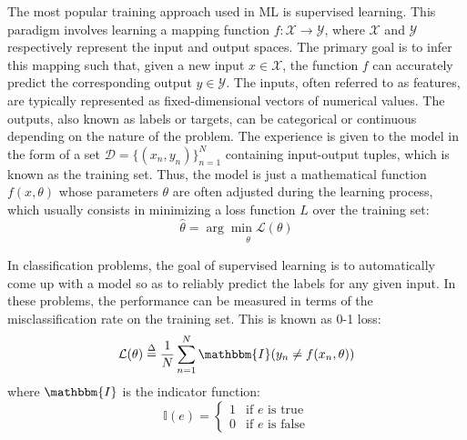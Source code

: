 \documentclass[11pt,english,listoffigures,listoftables]{tfgetsinf}
\begin{document}
The most popular training approach used in ML is supervised learning. This paradigm involves learning a mapping function $f: \mathcal{X} \rightarrow \mathcal{Y}$, where $\mathcal{X}$ and $\mathcal{Y}$ respectively represent the input and output spaces. The primary goal is to infer this mapping such that, given a new input $x \in \mathcal{X}$, the function $f$ can accurately predict the corresponding output $y \in \mathcal{Y}$. The inputs, often referred to as features, are typically represented as fixed-dimensional vectors of numerical values. The outputs, also known as labels or targets, can be categorical or continuous depending on the nature of the problem. The experience is given to the model in the form of a set $\mathcal{D}=\{( x_{n},y_{n} )\}_{n=1}^N$ containing input-output tuples, which is known as the training set. Thus, the model is just a mathematical function $f(x,\theta)$ whose parameters \( \theta \) are often adjusted during the learning process, which usually consists in minimizing a loss function  \( L \) over the training set:
%
\begin{equation}
\hat\theta=\underset{\theta}{\arg\min \mathcal{L}(\theta)}
\end{equation}



In classification problems, the goal of supervised learning is to automatically come up with a model so as to reliably predict the labels for any given input. In these problems, the performance can be measured in terms of the misclassification rate on the training set. This is known as 0-1 loss:
%
\begin{equation}
\mathcal{L}(\theta)\overset{\Delta}{=}\frac{1}{N}\sum_{n=1}^{N}\mathbbm{I}(y_n\neq f(x_n,\theta))
\end{equation}
%
where \( \mathbbm{I} \) is the indicator function:
%
\begin{equation}
\mathbb{I}(e) = 
\begin{cases} 
1 & \text{if } e \text{ is true} \\ 
0 & \text{if } e \text{ is false} 
\end{cases}
\end{equation}
\end{document}
